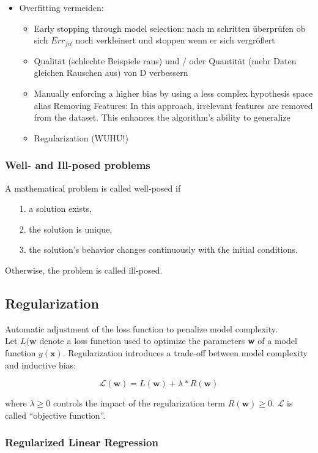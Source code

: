 \documentclass[11pt,a4paper]{article}
\begin{document}
\begin{flushleft}
\begin{itemize}
\item Overfitting vermeiden:
	\begin{itemize}
	\item Early stopping through model selection: nach m schritten überprüfen ob sich $ Err_{fit}$ noch verkleinert und stoppen wenn er sich vergrößert
	\item Qualität (schlechte Beispiele raus) und / oder Quantität (mehr Daten gleichen Rauschen aus) von D verbessern
	\item Manually enforcing a higher bias by using a less complex hypothesis space alias Removing Features: In this approach, irrelevant features are removed from the dataset.
This enhances the algorithm’s ability to generalize
	\item Regularization (WUHU!)
	\end{itemize}
\end{itemize}
\subsubsection{Well- and Ill-posed problems}
A mathematical problem is called well-posed if
\begin{itemize}
\item[1.] a solution exists,
\item[2.] the solution is unique,
\item[3.]the solution’s behavior changes continuously with the initial conditions.
\end{itemize}
Otherwise, the problem is called ill-posed.

\subsection{Regularization}
Automatic adjustment of the loss function to penalize model complexity. \\
Let $L(\textbf{w}$ denote a loss function used to optimize the parameters \textbf{w} of a model
function $y(\textbf{x})$. Regularization introduces a trade-off between model complexity and inductive bias:

$$\mathcal{L}(\textbf{w}) = L(\textbf{w}) + \lambda * R(\textbf{w})$$

where $\lambda \geq 0$ controls the impact of the regularization term $R(\textbf{w}) \geq 0$. $\mathcal{L} $ is called “objective function”.

\subsubsection{Regularized Linear Regression}


\end{flushleft}
\end{document}
